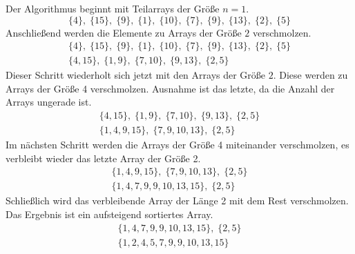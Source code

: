 \noindent
Der Algorithmus beginnt mit Teilarrays der Größe $n=1$.
\begin{equation*}
	\{4\},\;\{15\},\;\{9\},\;\{1\},\;\{10\},\;\{7\},\;\{9\},\;\{13\},\;\{2\},\;\{5\}
\end{equation*}
\noindent
Anschließend werden die Elemente zu Arrays der Größe $2$ verschmolzen.
\begin{gather*}
	\{4\},\;\{15\},\;\{9\},\;\{1\},\;\{10\},\;\{7\},\;\{9\},\;\{13\},\;\{2\},\;\{5\}\\
	\{4, 15\},\;\{1, 9\},\;\{7, 10\},\;\{9, 13\},\;\{2, 5\}
\end{gather*}
\noindent
Dieser Schritt wiederholt sich jetzt mit den Arrays der Größe $2$. Diese werden zu Arrays der Größe 4 verschmolzen. Ausnahme ist das letzte, da die Anzahl der Arrays ungerade ist.
\begin{gather*}
	\{4, 15\},\;\{1, 9\},\;\{7, 10\},\;\{9, 13\},\;\{2, 5\}\\
	\{1, 4, 9, 15\},\;\{7, 9, 10, 13\},\;\{2, 5\}
\end{gather*}
\noindent
Im nächsten Schritt werden die Arrays der Größe 4 miteinander verschmolzen, es verbleibt wieder das letzte Array der Größe 2.
\begin{gather*}
	\{1, 4, 9, 15\},\;\{7, 9, 10, 13\},\;\{2, 5\}\\
	\{1, 4, 7, 9, 9, 10, 13, 15\},\;\{2, 5\}
\end{gather*}
\noindent
Schließlich wird das verbleibende Array der Länge 2 mit dem Rest verschmolzen. Das Ergebnis ist ein aufsteigend sortiertes Array.
\begin{gather*}
	\{1, 4, 7, 9, 9, 10, 13, 15\},\;\{2, 5\}\\
	\{1, 2, 4, 5, 7, 9, 9, 10, 13, 15\}
\end{gather*}